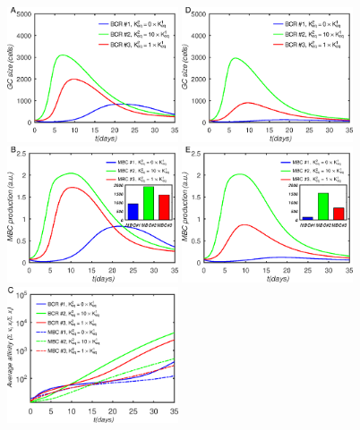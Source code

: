 \begin{figure}
\centering
\includegraphics[width=0.45\textwidth]{../figS13abc/gcsize.eps}
\includegraphics[width=0.45\textwidth]{../figS13def/gcsize.eps}
\includegraphics[width=0.45\textwidth]{../figS13abc/dmbc.eps}
\includegraphics[width=0.45\textwidth]{../figS13def/dmbc.eps}
\includegraphics[width=0.45\textwidth]{../figS13abc/A.eps}

\end{figure}
